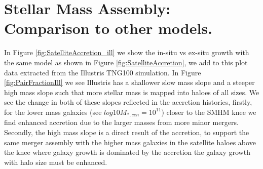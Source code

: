 
\chapter{Stellar Mass Assembly: Comparison to other models.}
\label{Appx:StellarMassAssembly}

In Figure \ref{fig:SatelliteAccretion_ill} we show the in-situ vs ex-situ growth with the same model as shown in Figure \ref{fig:SatelliteAccretion}, we add to this plot data extracted from the Illustris TNG100 simulation. In Figure \ref{fig:PairFractionIll} we see Illustris has a shallower slow mass slope and a steeper high mass slope such that more stellar mass is mapped into haloes of all sizes. We see the change in both of these slopes reflected in the accretion histories, firstly, for the lower mass galaxies (see $log 10 M_{*,cen} = 10^{11}$)  closer to the SMHM knee we find enhanced accretion due to the larger masses from more minor mergers. Secondly, the high mass slope is a direct result of the accretion, to support the same merger assembly with the higher mass galaxies in the satellite haloes above the knee where galaxy growth is dominated by the accretion the galaxy growth with halo size must be enhanced.
 

